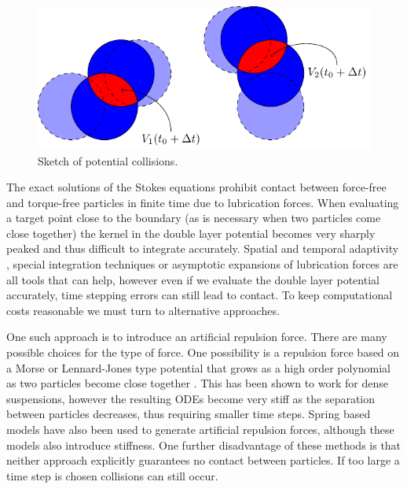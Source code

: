 \documentclass[preprint, 10pt]{elsarticle}
\begin{document}
\begin{figure}[!h]\label{fig:collision_sketch}
\begin{center}
\includegraphics{figures/collisions.pdf}
\end{center}
\caption{Sketch of potential collisions.}
\end{figure}
The exact solutions of the Stokes equations prohibit contact between
force-free and torque-free particles in finite time due to lubrication
forces. When evaluating a target point close to the boundary (as is necessary when two particles come close together) the kernel in the double layer potential becomes very sharply peaked and thus difficult to integrate accurately. Spatial and temporal adaptivity \cite{Kropinski1999}, special integration techniques \cite{Klockner2013, Ying2006} or asymptotic expansions of lubrication forces \cite{Mammoli2006} are all tools that can help, however even if we evaluate the double layer potential accurately, time stepping errors can still lead to contact. To keep computational costs reasonable we must turn to alternative approaches. 

One such approach is to introduce an artificial repulsion force. There
are many possible choices for the type of force. One possibility is a repulsion force based on a Morse or 
Lennard-Jones type potential that grows as a high order polynomial as two particles become close together \cite{Flormann2017, Liu2006}. This has been shown to work for dense
suspensions, however the resulting ODEs become very stiff as the
separation between particles decreases, thus requiring smaller time
steps. Spring based models \cite{Tsubota2006, Zhao2013, Kabacogulu2017} have also been used to generate artificial repulsion forces, although these models also introduce stiffness. One further disadvantage of these methods is that neither approach explicitly guarantees no contact between particles. If too large a time step is chosen collisions can still occur. 
\end{document}
